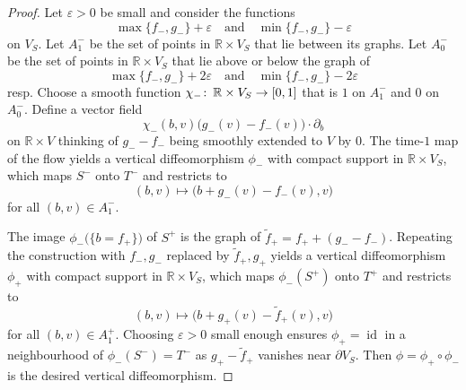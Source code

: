 \documentclass[10pt,a4paper]{amsart}
\newcommand{\R}{\mathbb R}
\def\co{\colon\thinspace}
\DeclareMathOperator{\id}{\mathrm{id}}
\newcommand{\ra}{\rightarrow}
\begin{document}
\begin{proof}
  Let $\varepsilon>0$ be small and consider the functions
  \[
  \max\{f_-,g_-\}+\varepsilon
  \quad\text{and}\quad
  \min\{f_-,g_-\}-\varepsilon
  \]
  on $V_S$.
  Let $A_1^-$ be the set of points in $\R\times V_S$
  that lie between its graphs.
  Let $A_0^-$ be the set of points in $\R\times V_S$
  that lie above or below the graph of
  \[
  \max\{f_-,g_-\}+2\varepsilon
  \quad\text{and}\quad
  \min\{f_-,g_-\}-2\varepsilon
  \]
  resp.
  Choose a smooth function $\chi_-\co\R\times V_S\ra [0,1]$
  that is $1$ on $A_1^-$ and $0$ on $A_0^-$.
  Define a vector field
  \[
  \chi_-(b,v)
  \Big(g_-(v)-f_-(v)\Big)
  \cdot\partial_b
  \]
  on $\R\times V$ thinking of $g_--f_-$ being smoothly extended
  to $V$ by $0$.
  The time-$1$ map of the flow
  yields a vertical diffeomorphism $\phi_-$
  with compact support in $\R\times V_S$,
  which maps $S^-$ onto $T^-$ and restricts to
  \[
  (b,v)\longmapsto\Big(b+g_-(v)-f_-(v),v\Big)
  \]
  for all $(b,v)\in A_1^-$.
  
  The image $\phi_-\big(\{b=f_+\}\big)$ of $S^+$ is the graph of
  $\tilde{f}_+=f_++(g_--f_-)$.
  Repeating the construction with $f_-,g_-$ replaced by $\tilde{f}_+,g_+$
  yields a vertical diffeomorphism $\phi_+$
  with compact support in $\R\times V_S$,
  which maps $\phi_-(S^+)$ onto $T^+$ and restricts to
  \[
  (b,v)\longmapsto\Big(b+g_+(v)-\tilde{f}_+(v),v\Big)
  \]
  for all $(b,v)\in A_1^+$.
  Choosing $\varepsilon>0$ small enough
  ensures $\phi_+=\id$ in a neighbourhood of $\phi_-(S^-)=T^-$
  as $g_+-\tilde{f}_+$ vanishes near $\partial V_S$.
  Then $\phi=\phi_+\circ\phi_-$
  is the desired vertical diffeomorphism.
\end{proof}
\end{document}
